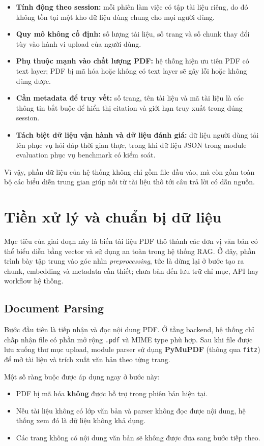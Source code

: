 \documentclass[12pt]{ai_conquer2026}
\begin{document}
\begin{itemize}
    \item \textbf{Tính động theo session:} mỗi phiên làm việc có tập tài liệu riêng, do đó không tồn tại một kho dữ liệu dùng chung cho mọi người dùng.
    \item \textbf{Quy mô không cố định:} số lượng tài liệu, số trang và số chunk thay đổi tùy vào hành vi upload của người dùng.
    \item \textbf{Phụ thuộc mạnh vào chất lượng PDF:} hệ thống hiện ưu tiên PDF có text layer; PDF bị mã hóa hoặc không có text layer sẽ gây lỗi hoặc không dùng được.
    \item \textbf{Cần metadata để truy vết:} số trang, tên tài liệu và mã tài liệu là các thông tin bắt buộc để hiển thị citation và giới hạn truy xuất trong đúng session.
    \item \textbf{Tách biệt dữ liệu vận hành và dữ liệu đánh giá:} dữ liệu người dùng tải lên phục vụ hỏi đáp thời gian thực, trong khi dữ liệu JSON trong module evaluation phục vụ benchmark có kiểm soát.
\end{itemize}

Vì vậy, phần dữ liệu của hệ thống không chỉ gồm file đầu vào, mà còn gồm toàn bộ các biểu diễn trung gian giúp nối từ tài liệu thô tới câu trả lời có dẫn nguồn.

\section{Tiền xử lý và chuẩn bị dữ liệu}

Mục tiêu của giai đoạn này là biến tài liệu PDF thô thành các đơn vị văn bản có thể biểu diễn bằng vector và sử dụng an toàn trong hệ thống RAG. Ở đây, phần trình bày tập trung vào góc nhìn \textit{preprocessing}, tức là dừng lại ở bước tạo ra chunk, embedding và metadata cần thiết; chưa bàn đến lưu trữ chỉ mục, API hay workflow hệ thống.

\subsection{Document Parsing}

Bước đầu tiên là tiếp nhận và đọc nội dung PDF. Ở tầng backend, hệ thống chỉ chấp nhận file có phần mở rộng \texttt{.pdf} và MIME type phù hợp. Sau khi file được lưu xuống thư mục upload, module parser sử dụng \textbf{PyMuPDF} (thông qua \texttt{fitz}) để mở tài liệu và trích xuất văn bản theo từng trang.

Một số ràng buộc được áp dụng ngay ở bước này:
\begin{itemize}
    \item PDF bị mã hóa \textbf{không} được hỗ trợ trong phiên bản hiện tại.
    \item Nếu tài liệu không có lớp văn bản và parser không đọc được nội dung, hệ thống xem đó là dữ liệu không khả dụng.
    \item Các trang không có nội dung văn bản sẽ không được đưa sang bước tiếp theo.
\end{itemize}
\end{document}
